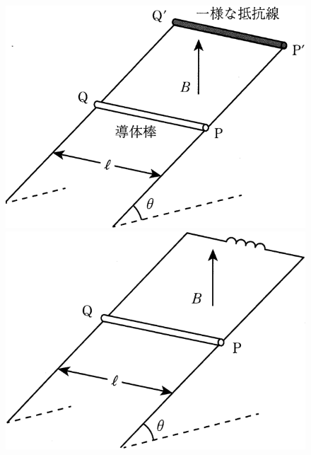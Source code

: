 \begin{figure}[H]
  \centering
  \begin{minipage}{.3\columnwidth}
    \includegraphics[width=\columnwidth]{../graphs/chiba_23_4-1.png}
    \caption{}
  \end{minipage}
  \hspace{.1\columnwidth}
  \begin{minipage}{.3\columnwidth}
    \centering
    \includegraphics[width=\columnwidth]{../graphs/chiba_23_4-2.png}
    \caption{} 
  \end{minipage}
\end{figure}

